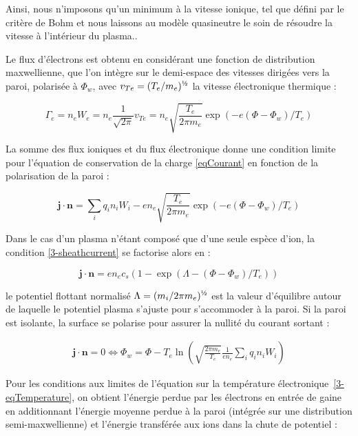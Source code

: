 \begin{refsection}
{Ainsi, nous n'imposons qu'un minimum à la vitesse ionique, tel que défini par
le critère de Bohm et nous laissons au modèle quasineutre le soin de résoudre la
vitesse à l'intérieur du plasma.}.

Le flux d'électrons est obtenu en considérant une fonction de distribution
maxwellienne, que l'on intègre sur le demi-espace des vitesses dirigées vers la
paroi, polarisée à $\Phi_w$, avec $v_{Te}=(T_e/m_e)^{\text{\textonehalf}}$ la
vitesse électronique thermique :

\begin{equation}
\Gamma_e=n_eW_e=n_e\frac{1}{\sqrt{2\pi}}v_{Te}=n_e\sqrt{\frac{T_e}{2\pi
m_e}}\exp(-e(\Phi-\Phi_w)/T_e)
\end{equation}

La somme des flux
ioniques et du flux électronique donne une condition limite pour l'équation de
conservation de la charge \eqref{eqCourant} en fonction de la polarisation de la paroi
:

\begin{equation}
\label{3-sheathcurrent}
\mathbf{j}\cdot\mathbf{n}=\sum_i{q_in_iW_i}
-en_e\sqrt{\frac{T_e}{2\pi
m_e}}\exp(-e(\Phi-\Phi_w)/T_e)
\end{equation}

Dans
le cas d'un plasma n'étant composé que d'une seule espèce d'ion, 
la condition \ref{3-sheathcurrent} se factorise alors en :

\begin{equation}
\mathbf{j}\cdot\mathbf{n}=en_ec_s(1-\exp(\Lambda-(\Phi-\Phi_w)/T_e))
\end{equation}

le potentiel flottant normalisé $\Lambda=({m_i}/{2\pi
m_e})^{\text{\textonehalf}}$ est la valeur d'équilibre autour de laquelle
le potentiel plasma s'ajuste pour s'accommoder à la paroi.
Si la paroi est isolante, la surface se polarise
pour assurer la nullité du courant sortant :

\begin{equation}\begin{split}
\mathbf j\cdot\mathbf{n}=0\Leftrightarrow
\Phi_w=\Phi-T_e\ln\left(\sqrt{\frac{2\pi
m_e}{T_e}}\frac{1}{en_e}\sum_iq_in_iW_i\right)
\end{split}\end{equation}

Pour les conditions aux limites de l'équation sur la température
électronique~\eqref{3-eqTemperature}, on obtient l'énergie perdue par les
électrons en entrée de gaine en additionnant l'énergie moyenne perdue à la paroi (intégrée sur une distribution semi-maxwellienne) et l'énergie transférée aux ions dans la chute de potentiel :


\end{refsection}
